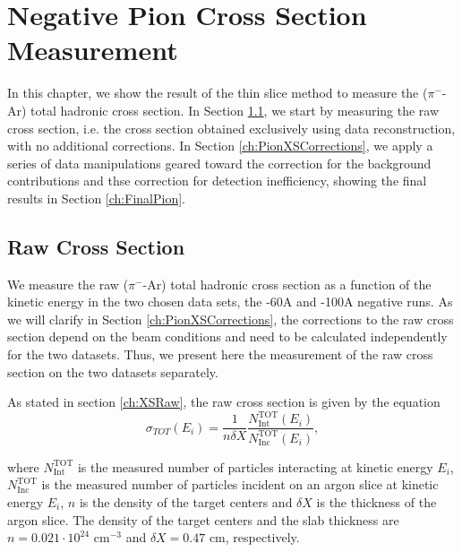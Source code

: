 \chapter{Negative Pion Cross Section Measurement}\label{ch:PionXS}

In this chapter, we show the result of the thin slice method to measure 
the ($\pi^-$-Ar) total hadronic cross section. In Section \ref{ch:PionXSRaw}, we start by measuring the raw cross section, i.e. the cross section obtained exclusively using data reconstruction, with no additional corrections. In Section \ref{ch:PionXSCorrections}, we apply a series of data manipulations geared toward the correction for the background contributions and thse correction for detection inefficiency, showing the final results in Section \ref{ch:FinalPion}.


\section{Raw Cross Section}\label{ch:PionXSRaw}
We measure the raw ($\pi^-$-Ar) total hadronic cross section as a function of the kinetic energy in the two chosen data sets, the -60A and -100A negative runs. 
As we will clarify in Section \ref{ch:PionXSCorrections},  the corrections to the raw cross section depend on the beam conditions and need to be calculated independently for the two datasets. Thus, we present here the measurement of the raw cross section on the two datasets separately.


As stated in section \ref{ch:XSRaw},  the raw cross section is given by the equation \label{eq:thinTargetXSSolved}
\begin{equation}
 \sigma_{TOT} (E_i)  = \frac{1}{n \delta X}\frac{N^{\text{TOT}}_{\text{Int}}(E_i)}{N^{\text{TOT}}_{\text{Inc}}(E_i)},
\end{equation}

where $N^{\text{TOT}}_{\text{Int}}$  is the measured number of particles interacting at kinetic energy $E_i$, $N^{\text{TOT}}_{\text{Inc}}$ is the  measured  number of particles incident  on an argon slice at  kinetic energy $E_i$,  $n$ is the density of the target centers  and $\delta X$ is the thickness of the argon slice. The density of the target centers and the slab thickness are $n = 0.021\cdot10^{24} \text{ cm}^{-3} $ and  $\delta X=0.47\text{ cm}$, respectively.


